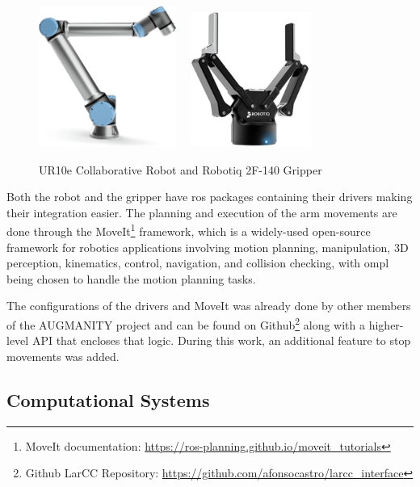 \begin{figure}[ht]
    \centerline{\includegraphics[width=0.4\textwidth]{figs/UR10e.jpg} \ \ \includegraphics[width=0.35\textwidth]{figs/robotiq-2f-140.jpg}}
    \caption[UR10e Collaborative Robot and Robotiq 2F-140 Gripper]{UR10e Collaborative Robot \cite{UR10e_image} and Robotiq 2F-140 Gripper \cite{robotiq_gripper}}
    \label{fig:ur10e}
\end{figure}

Both the robot and the gripper have \acs{ros} packages containing their drivers making their integration easier. The planning and execution of the arm movements are done through the MoveIt\footnote{MoveIt documentation: \url{https://ros-planning.github.io/moveit_tutorials}} framework, which is a widely-used open-source framework for robotics applications involving motion planning, manipulation, 3D perception, kinematics, control, navigation, and collision checking, with \acs{ompl} being chosen to handle the motion planning tasks.

The configurations of the drivers and MoveIt was already done by other members of the AUGMANITY project and can be found on Github\footnote{Github LarCC Repository: \url{https://github.com/afonsocastro/larcc_interface}} along with a higher-level API that encloses that logic. During this work, an additional feature to stop movements was added.

\subsection{Computational Systems}


